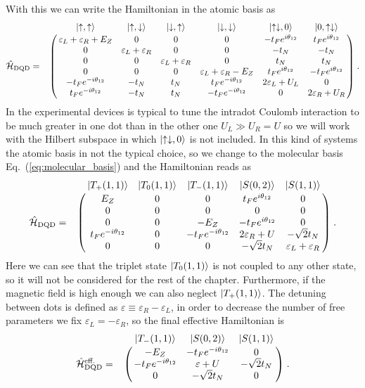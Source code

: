 With this we can write the Hamiltonian in the atomic basis as
\begin{equation}
	\hat{\mathcal{H}}_{\text{DQD}}=\bordermatrix{~ & \ket{\uparrow,\uparrow} & \ket{\uparrow,\downarrow} & \ket{\downarrow,\uparrow} & \ket{\downarrow,\downarrow} & \ket{\uparrow\downarrow,0} & \ket{0,\uparrow\downarrow}\cr
		~ & \varepsilon_L+\varepsilon_R+E_Z & 0 & 0 & 0 & -t_Fe^{i\theta_{12}} & t_Fe^{i\theta_{12}} \cr
		~ & 0 & \varepsilon_L+\varepsilon_R & 0 & 0 & -t_N & -t_N\cr
		~ & 0 & 0 & \varepsilon_L+\varepsilon_R & 0 & t_N & t_N\cr
		~ & 0 & 0 & 0 & \varepsilon_L+\varepsilon_R -E_Z & t_Fe^{i\theta_{12}} & -t_Fe^{i\theta_{12}}\cr
		~ & -t_Fe^{-i\theta_{12}} & -t_N & t_N & t_Fe^{-i\theta_{12}} &  2\varepsilon_L+U_L & 0 \cr
		~ & t_Fe^{-i\theta_{12}} & -t_N & t_N & -t_Fe^{-i\theta_{12}} &  0 & 2\varepsilon_R+U_R \cr}\; .
\end{equation}
In the experimental devices is typical to tune the intradot Coulomb interaction to be much greater in one dot than in the other one $U_L\gg U_R=U$ so we will work with the Hilbert subspace in which $\ket{\uparrow\downarrow,0}$ is not included. In this kind of systems the atomic basis in not the typical choice, so we change to the molecular basis Eq.~(\ref{eq:molecular_basis}) and the Hamiltonian reads as
\begin{equation}
\hat{\mathcal{H}}_{\text{DQD}}=\bordermatrix{~ & \ket{T_+(1,1)} & \ket{T_0(1,1)} & \ket{T_-(1,1)} & \ket{S(0,2)} & \ket{S(1,1)}\cr
	~ & E_Z & 0 & 0 & t_Fe^{i\theta_{12}} & 0 \cr
	~ & 0 & 0 & 0 & 0 & 0\cr
	~ & 0 & 0 & -E_Z & -t_Fe^{i\theta_{12}} & 0 \cr
	~ & t_Fe^{-i\theta_{12}} & 0 & -t_Fe^{-i\theta_{12}} & 2\varepsilon_R+U & -\sqrt{2}t_N \cr
	~ & 0 & 0 & 0 & -\sqrt{2}t_N &  \varepsilon_L+\varepsilon_R  \cr}\; .
\label{eq:Hamiltonain_DQD_2HH_Full}
\end{equation}
Here we can see that the triplet state $\ket{T_0(1,1)}$ is not coupled to any other state, so it will not be considered for the rest of the chapter. Furthermore, if the magnetic field is high enough we can also neglect $\ket{T_+(1,1)}$. The detuning between dots is defined as $\varepsilon\equiv \varepsilon_R-\varepsilon_L$, in order to decrease the number of free parameters we fix $\varepsilon_L=-\varepsilon_R$, so the final effective Hamiltonian is
\begin{equation}
\hat{\mathcal{H}}_{\text{DQD}}^{\text{eff.}}=\bordermatrix{~ & \ket{T_-(1,1)} & \ket{S(0,2)} & \ket{S(1,1)}\cr
	~ & -E_Z & -t_Fe^{-i\theta_{12}} & 0 \cr
	~ & -t_Fe^{-i\theta_{12}} & \varepsilon +U & -\sqrt{2}t_N \cr
	~ & 0 & -\sqrt{2}t_N &  0  \cr}\; .
\label{eq:effective_Hamiltonian_DQD}
\end{equation}
